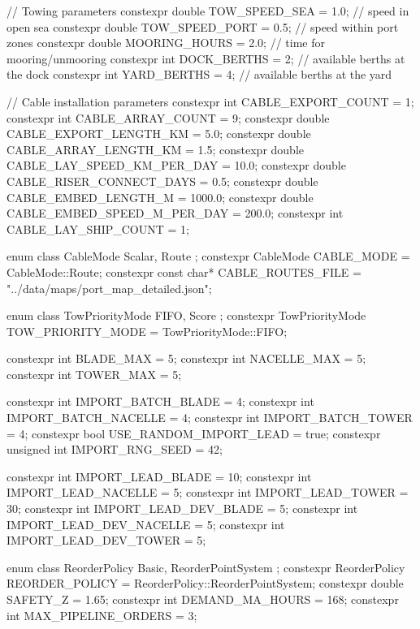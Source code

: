 \documentclass[10pt,letterpaper]{jsarticle}
\begin{document}
\begin{cppcode}
// Towing parameters
constexpr double TOW_SPEED_SEA = 1.0;        // speed in open sea
constexpr double TOW_SPEED_PORT = 0.5;       // speed within port zones
constexpr double MOORING_HOURS = 2.0;        // time for mooring/unmooring
constexpr int DOCK_BERTHS = 2;               // available berths at the dock
constexpr int YARD_BERTHS = 4;               // available berths at the yard

// Cable installation parameters
constexpr int CABLE_EXPORT_COUNT = 1;
constexpr int CABLE_ARRAY_COUNT = 9;
constexpr double CABLE_EXPORT_LENGTH_KM = 5.0;
constexpr double CABLE_ARRAY_LENGTH_KM = 1.5;
constexpr double CABLE_LAY_SPEED_KM_PER_DAY = 10.0;
constexpr double CABLE_RISER_CONNECT_DAYS = 0.5;
constexpr double CABLE_EMBED_LENGTH_M = 1000.0;
constexpr double CABLE_EMBED_SPEED_M_PER_DAY = 200.0;
constexpr int CABLE_LAY_SHIP_COUNT = 1;

enum class CableMode { Scalar, Route };
constexpr CableMode CABLE_MODE = CableMode::Route;
constexpr const char* CABLE_ROUTES_FILE = "../data/maps/port_map_detailed.json";

enum class TowPriorityMode { FIFO, Score };
constexpr TowPriorityMode TOW_PRIORITY_MODE = TowPriorityMode::FIFO;

constexpr int BLADE_MAX = 5;
constexpr int NACELLE_MAX = 5;
constexpr int TOWER_MAX = 5;

constexpr int IMPORT_BATCH_BLADE = 4;
constexpr int IMPORT_BATCH_NACELLE = 4;
constexpr int IMPORT_BATCH_TOWER = 4;
constexpr bool USE_RANDOM_IMPORT_LEAD = true;
constexpr unsigned int IMPORT_RNG_SEED = 42;

constexpr int IMPORT_LEAD_BLADE = 10;
constexpr int IMPORT_LEAD_NACELLE = 5;
constexpr int IMPORT_LEAD_TOWER = 30;
constexpr int IMPORT_LEAD_DEV_BLADE = 5;
constexpr int IMPORT_LEAD_DEV_NACELLE = 5;
constexpr int IMPORT_LEAD_DEV_TOWER = 5;

enum class ReorderPolicy { Basic, ReorderPointSystem };
constexpr ReorderPolicy REORDER_POLICY = ReorderPolicy::ReorderPointSystem;
constexpr double SAFETY_Z = 1.65;
constexpr int DEMAND_MA_HOURS = 168;
constexpr int MAX_PIPELINE_ORDERS = 3;
\end{cppcode}
\end{document}
